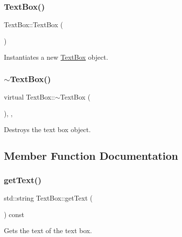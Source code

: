 \subsubsection{\texorpdfstring{TextBox()}{TextBox()}}
{\footnotesize\ttfamily Text\+Box\+::\+Text\+Box (\begin{DoxyParamCaption}{ }\end{DoxyParamCaption})}



Instantiates a new \mbox{\hyperlink{class_text_box}{Text\+Box}} object. 

\mbox{\label{class_text_box_ae49e0bebccce519f007fb8edaf9228b3}} 
\subsubsection{\texorpdfstring{$\sim$TextBox()}{~TextBox()}}
{\footnotesize\ttfamily virtual Text\+Box\+::$\sim$\+Text\+Box (\begin{DoxyParamCaption}{ }\end{DoxyParamCaption})\hspace{0.3cm}{\ttfamily [inline]}, {\ttfamily [override]}, {\ttfamily [virtual]}}



Destroys the text box object. 



\subsection{Member Function Documentation}
\mbox{\label{class_text_box_a43eb76f2ff7db001766ab9c0096e334d}} 
\subsubsection{\texorpdfstring{getText()}{getText()}}
{\footnotesize\ttfamily std\+::string Text\+Box\+::get\+Text (\begin{DoxyParamCaption}{ }\end{DoxyParamCaption}) const}



Gets the text of the text box. 

\mbox{\label{class_text_box_abd8f18ee1d846bf8cdf0ab93b6302bf9}} 
